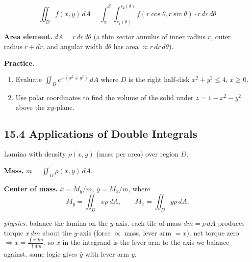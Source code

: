 \documentclass[12pt]{article}
\theoremstyle{compact}
\begin{document}
\[
\iint_D f(x,y)\,dA = \int_\alpha^\beta\int_{r_1(\theta)}^{r_2(\theta)} f(r\cos\theta,r\sin\theta)\cdot r\,dr\,d\theta
\]

\textbf{Area element.} $dA = r\,dr\,d\theta$ (a thin sector annulus of inner radius $r$, outer radius $r+dr$, and angular width $d\theta$ has area $\approx r\,dr\,d\theta$).

\begin{center}
\end{center}


\medskip\textbf{Practice.}
\begin{enumerate}[noitemsep]
  \item Evaluate $\iint_D e^{-(x^2+y^2)}\,dA$ where $D$ is the right half-disk $x^2+y^2\le4$, $x\ge0$.
  \item Use polar coordinates to find the volume of the solid under $z=1-x^2-y^2$ above the $xy$-plane.
\end{enumerate}

\subsection{15.4 Applications of Double Integrals}

Lamina with density $\rho(x,y)$ (mass per area) over region $D$.

\textbf{Mass.} $m = \iint_D \rho(x,y)\,dA$.

\textbf{Center of mass.} $\bar{x} = M_y/m,\ \bar{y} = M_x/m$, where
\[
M_y = \iint_D x\rho\,dA,\qquad M_x = \iint_D y\rho\,dA.
\]

\textit{physics.} balance the lamina on the $y$-axis. each tile of mass $dm=\rho\,dA$ produces torque $x\,dm$ about the $y$-axis (force $\propto$ mass, lever arm $=x$). net torque zero $\Rightarrow \bar x=\frac{\int x\,dm}{\int dm}$. so $x$ in the integrand is the lever arm to the axis we balance against. same logic gives $\bar y$ with lever arm $y$.
\end{document}
